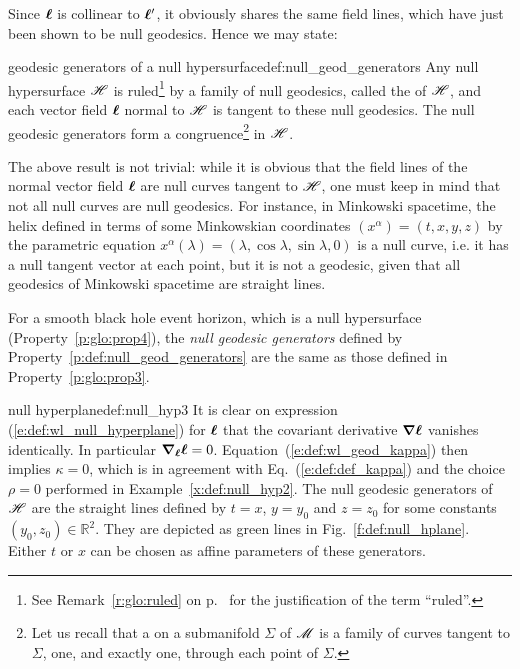 Since $\bm{\ell}$ is collinear to $\bm{\ell}'$, it obviously shares the same field lines,
which have just been shown to be null geodesics. Hence we may state:

\begin{tprop}{geodesic generators of a null hypersurface}{def:null_geod_generators}
Any null hypersurface $\mathscr{H}$ is ruled\footnote{See Remark~\ref{r:glo:ruled} on p.~\pageref{r:glo:ruled} for the justification of the term ``ruled''.}
by a family of null geodesics, called the
 of $\mathscr{H}$, and each vector field $\bm{\ell}$ normal to $\mathscr{H}$ is
tangent to these null geodesics. The null geodesic generators
form a congruence\footnote{Let us recall that a  on a
submanifold $\Sigma$ of $\mathscr{M}$ is a family of curves tangent to $\Sigma$, one, and exactly one, through
each point of $\Sigma$.}
in $\mathscr{H}$.
\end{tprop}

\begin{remark}
\label{r:def:null_curves}
The above result is not trivial: while it is obvious that the field lines of the normal
vector field $\bm{\ell}$ are null curves tangent to $\mathscr{H}$, one must
keep in mind that not all null curves are null geodesics. For instance, in
Minkowski spacetime, the helix defined in terms of
some Minkowskian coordinates $(x^\alpha)=(t,x,y,z)$ by the parametric equation
$x^\alpha(\lambda) = (\lambda, \cos\lambda, \sin\lambda, 0)$ is a null curve, i.e.
it has a null tangent vector at each point, but it is not a geodesic, given that
all geodesics of Minkowski spacetime are straight lines.
\end{remark}

For a smooth black hole event horizon, which is a null hypersurface (Property~\ref{p:glo:prop4}),
the \emph{null geodesic generators} defined
by Property~\ref{p:def:null_geod_generators} are the same as those
defined in Property~\ref{p:glo:prop3}.

\begin{texample}{null hyperplane}{def:null_hyp3}
It is clear on expression (\ref{e:def:wl_null_hyperplane}) for $\bm{\ell}$ that
the covariant derivative
$\bm{\nabla} \bm{\ell}$ vanishes identically. In particular $\bm{\nabla}_{\bm{\ell}} \bm{\ell} = 0$.
Equation~(\ref{e:def:wl_geod_kappa}) then implies $\kappa = 0$,
which is in agreement with Eq.~(\ref{e:def:def_kappa}) and the choice $\rho=0$
performed in Example~\ref{x:def:null_hyp2}. The null geodesic generators of $\mathscr{H}$ are the
straight lines defined by $t=x$, $y=y_0$ and $z=z_0$ for some constants
$(y_0,z_0)\in \mathbb{R}^2$.
They are depicted as green lines in Fig.~\ref{f:def:null_hplane}.
 Either $t$ or $x$ can be chosen as affine
parameters of these generators.
\end{texample}

